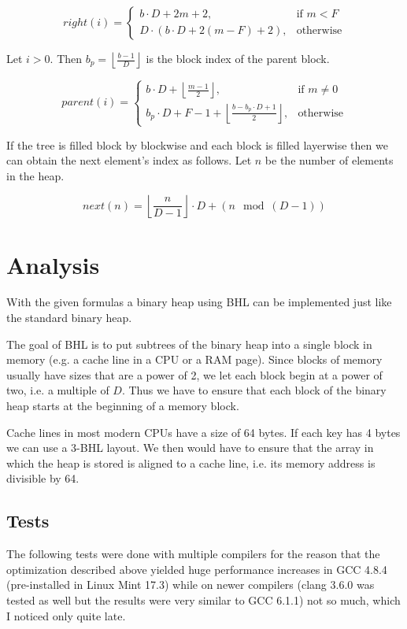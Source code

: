 \documentclass[10pt, a4paper]{article}
\begin{document}
\[right(i) = \begin{cases} b\cdot D + 2m + 2, & \textrm{if }m < F \\ D\cdot (b\cdot D + 2(m-F)+2), & \textrm{otherwise} \end{cases}\]

Let $i>0$. Then $b_p=\left\lfloor\frac{b-1}{D}\right\rfloor$ is the block index of the parent block.

\[parent(i) = \begin{cases} b\cdot D + \left\lfloor\frac{m - 1}{2}\right\rfloor, & \textrm{if }m \neq 0 \\ b_p \cdot D + F - 1 + \left\lfloor\frac{b-b_p\cdot D + 1}{2}\right\rfloor, & \textrm{otherwise} \end{cases}\]

If the tree is filled block by blockwise and each block is filled layerwise then we can obtain the next element's index as follows. Let $n$ be the number of elements in the heap.

\[next(n)=\left\lfloor\frac{n}{D-1}\right\rfloor\cdot D + (n \mod (D-1))\]

\section{Analysis}

With the given formulas a binary heap using BHL can be implemented just like the standard binary heap.

The goal of BHL is to put subtrees of the binary heap into a single block in memory (e.g. a cache line in a CPU or a RAM page).
Since blocks of memory usually have sizes that are a power of 2, we let each block begin at a power of two, i.e. a multiple of $D$.
Thus we have to ensure that each block of the binary heap starts at the beginning of a memory block.

Cache lines in most modern CPUs have a size of 64 bytes. If each key has 4 bytes we can use a 3-BHL layout. We then would have to ensure that the array in which the heap is stored is aligned to a cache line, i.e. its memory address is divisible by 64.

\subsection{Tests}

The following tests were done with multiple compilers for the reason that the optimization described above yielded huge performance increases in GCC 4.8.4 (pre-installed in Linux Mint 17.3) while on newer compilers (clang 3.6.0 was tested as well but the results were very similar to GCC 6.1.1) not so much, which I noticed only quite late.
\end{document}
